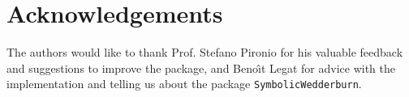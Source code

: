 \section{Acknowledgements}
The authors would like to thank Prof. Stefano Pironio for his valuable feedback and suggestions to improve the package, and Beno\^{\i}t Legat for advice with the implementation and telling us about the package \texttt{SymbolicWedderburn}.